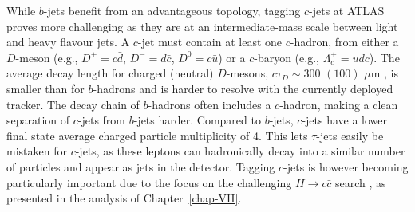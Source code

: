 While $b$-jets benefit from an advantageous topology, tagging $c$-jets at ATLAS proves more challenging as they are at an intermediate-mass scale between light and heavy flavour jets. A $c$-jet must contain at least one $c$-hadron, from either a $D$-meson (e.g., $D^+=c\bar{d}$, $D^-=d\bar{c}$, $D^0=c\bar{u}$) or a $c$-baryon (e.g., $\Lambda_c^+=udc$). The average decay length for charged (neutral) $D$-mesons, $c\tau_D \sim 300$ $(100)$ $\mu$m \cite{Tanabashi:2018oca}, is smaller than for $b$-hadrons and is harder to resolve with the currently deployed tracker. The decay chain of $b$-hadrons often includes a $c$-hadron, making a clean separation of $c$-jets from $b$-jets harder. Compared to $b$-jets, $c$-jets have a lower final state average charged particle multiplicity of 4. This lets $\tau$-jets easily be mistaken for $c$-jets, as these leptons can hadronically decay into a similar number of particles and appear as jets in the detector. Tagging $c$-jets is however becoming particularly important due to the focus on the challenging $H \rightarrow c\bar{c}$ search \cite{Aaboud:2018fhh, Collaboration:2721696, arXiv:2205.05550}, as presented in the analysis of Chapter~\ref{chap-VH}. 

